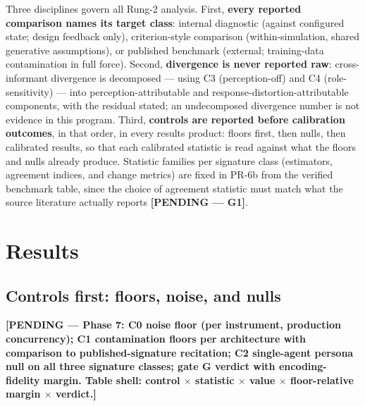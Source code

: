 \documentclass[12pt, letterpaper]{article}
\newcommand{\pending}[1]{\textcolor{blue!55!black}{\textbf{[PENDING --- #1]}}}
\begin{document}
Three disciplines govern all Rung-2 analysis. First, \textbf{every reported comparison names its target class}: internal diagnostic (against configured state; design feedback only), criterion-style comparison (within-simulation, shared generative assumptions), or published benchmark (external; training-data contamination in full force). Second, \textbf{divergence is never reported raw}: cross-informant divergence is decomposed --- using C3 (perception-off) and C4 (role-sensitivity) --- into perception-attributable and response-distortion-attributable components, with the residual stated; an undecomposed divergence number is not evidence in this program. Third, \textbf{controls are reported before calibration outcomes}, in that order, in every results product: floors first, then nulls, then calibrated results, so that each calibrated statistic is read against what the floors and nulls already produce. Statistic families per signature class (estimators, agreement indices, and change metrics) are fixed in PR-6b from the verified benchmark table, since the choice of agreement statistic must match what the source literature actually reports \pending{G1}.

\section{Results}
\label{sec:results}

\noindent{}

\subsection{Controls first: floors, noise, and nulls}
\pending{Phase 7: C0 noise floor (per instrument, production concurrency); C1 contamination floors per architecture with comparison to published-signature recitation; C2 single-agent persona null on all three signature classes; gate G verdict with encoding-fidelity margin. Table shell: control $\times$ statistic $\times$ value $\times$ floor-relative margin $\times$ verdict.}
\end{document}
